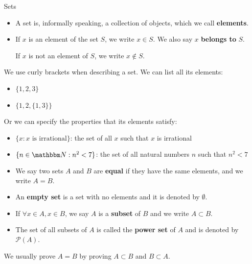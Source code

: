 \documentclass[9pt,aspectratio=169]{beamer}
\newcommand{\pP}{\mathcal P}
\newcommand{\NN}{\mathbbm N}
\begin{document}
\begin{frame}[allowframebreaks]{Sets}
    \begin{definition}
        \begin{itemize}
            \item A set is, informally speaking, a collection of objects, which
            we call \textbf{elements}.
            \item If $x$ is an element of the set $S$, we write $x \in S$. We
            also say $x$ \textbf{belongs to} $S$.

            If $x$ is not an element of $S$, we write $x \notin S$.
        \end{itemize}
    \end{definition}
    \framebreak
    We use curly brackets when describing a set. We can list all its
    elements:
    \begin{itemize}
        \item $\{1, 2, 3\}$
        \item $\big\{1, 2, \{1, 3\}\big\}$
    \end{itemize}
    Or we can specify the properties that its elements satisfy:
    \begin{itemize}
        \item $\{x: x \text{ is irrational}\}$: the set of all $x$ such
        that $x$ is irrational
        \item $\{n\in\NN: n^2 < 7\}$: the set of all natural numbers $n$
        such that $n^2 < 7$
    \end{itemize}
    \framebreak
    \begin{definition}
        \begin{itemize}
            \item We say two sets $A$ and $B$ are \textbf{equal} if they
            have the same elements, and we write $A = B$.
            \item An \textbf{empty set} is a set with no elements and it
            is denoted by $\emptyset$.
            \item If $\forall x\in A, x\in B$, we say $A$ is a
            \textbf{subset} of $B$ and we write $A \subset B$.
            \item The set of all subsets of $A$ is called the
            \textbf{power set} of $A$ and is denoted by $\pP(A)$.
        \end{itemize}
    \end{definition}
    We usually prove $A = B$ by proving $A \subset B$ and $B \subset A$.
\end{frame}
\end{document}
